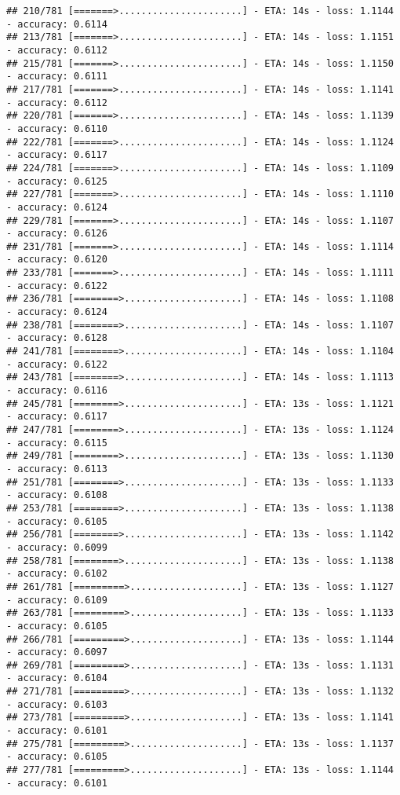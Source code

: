 \documentclass[
]{article}
\begin{document}
\begin{verbatim}
## 210/781 [=======>......................] - ETA: 14s - loss: 1.1144 - accuracy: 0.6114
## 213/781 [=======>......................] - ETA: 14s - loss: 1.1151 - accuracy: 0.6112
## 215/781 [=======>......................] - ETA: 14s - loss: 1.1150 - accuracy: 0.6111
## 217/781 [=======>......................] - ETA: 14s - loss: 1.1141 - accuracy: 0.6112
## 220/781 [=======>......................] - ETA: 14s - loss: 1.1139 - accuracy: 0.6110
## 222/781 [=======>......................] - ETA: 14s - loss: 1.1124 - accuracy: 0.6117
## 224/781 [=======>......................] - ETA: 14s - loss: 1.1109 - accuracy: 0.6125
## 227/781 [=======>......................] - ETA: 14s - loss: 1.1110 - accuracy: 0.6124
## 229/781 [=======>......................] - ETA: 14s - loss: 1.1107 - accuracy: 0.6126
## 231/781 [=======>......................] - ETA: 14s - loss: 1.1114 - accuracy: 0.6120
## 233/781 [=======>......................] - ETA: 14s - loss: 1.1111 - accuracy: 0.6122
## 236/781 [========>.....................] - ETA: 14s - loss: 1.1108 - accuracy: 0.6124
## 238/781 [========>.....................] - ETA: 14s - loss: 1.1107 - accuracy: 0.6128
## 241/781 [========>.....................] - ETA: 14s - loss: 1.1104 - accuracy: 0.6122
## 243/781 [========>.....................] - ETA: 14s - loss: 1.1113 - accuracy: 0.6116
## 245/781 [========>.....................] - ETA: 13s - loss: 1.1121 - accuracy: 0.6117
## 247/781 [========>.....................] - ETA: 13s - loss: 1.1124 - accuracy: 0.6115
## 249/781 [========>.....................] - ETA: 13s - loss: 1.1130 - accuracy: 0.6113
## 251/781 [========>.....................] - ETA: 13s - loss: 1.1133 - accuracy: 0.6108
## 253/781 [========>.....................] - ETA: 13s - loss: 1.1138 - accuracy: 0.6105
## 256/781 [========>.....................] - ETA: 13s - loss: 1.1142 - accuracy: 0.6099
## 258/781 [========>.....................] - ETA: 13s - loss: 1.1138 - accuracy: 0.6102
## 261/781 [=========>....................] - ETA: 13s - loss: 1.1127 - accuracy: 0.6109
## 263/781 [=========>....................] - ETA: 13s - loss: 1.1133 - accuracy: 0.6105
## 266/781 [=========>....................] - ETA: 13s - loss: 1.1144 - accuracy: 0.6097
## 269/781 [=========>....................] - ETA: 13s - loss: 1.1131 - accuracy: 0.6104
## 271/781 [=========>....................] - ETA: 13s - loss: 1.1132 - accuracy: 0.6103
## 273/781 [=========>....................] - ETA: 13s - loss: 1.1141 - accuracy: 0.6101
## 275/781 [=========>....................] - ETA: 13s - loss: 1.1137 - accuracy: 0.6105
## 277/781 [=========>....................] - ETA: 13s - loss: 1.1144 - accuracy: 0.6101

\end{verbatim}
\end{document}
